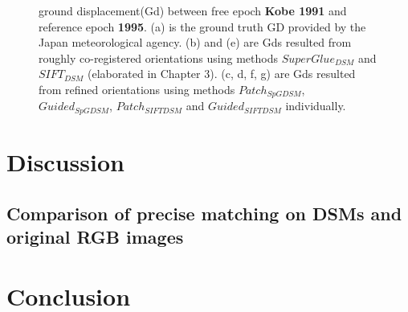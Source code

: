 \begin{figure}[htbp]
\begin{center}
		\caption{{\scriptsize ground displacement(Gd) between free epoch \textbf{Kobe 1991} and reference epoch \textbf{1995}. (a) is the ground truth GD provided by the Japan meteorological agency. (b) and (e) are Gds resulted from roughly co-registered orientations using methods $SuperGlue_{DSM}$ and $SIFT_{DSM}$ (elaborated in Chapter 3). (c, d, f, g) are Gds resulted from refined orientations using methods $Patch_{SpGDSM}$, $Guided_{SpGDSM}$, $Patch_{SIFTDSM}$ and $Guided_{SIFTDSM}$ individually.}}
		\label{GdKobe}
	\end{center}
\end{figure} 

\section{Discussion}
\subsection{Comparison of precise matching on DSMs and original RGB images}
\label{CompareRGBDSM}

\section{Conclusion}

